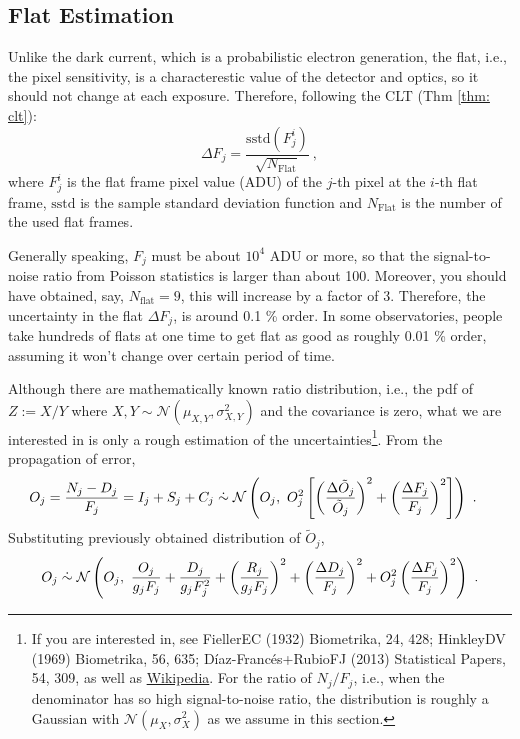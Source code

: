 \subsection{Flat Estimation}
Unlike the dark current, which is a probabilistic electron generation, the flat, i.e., the pixel sensitivity, is a characterestic value of the detector and optics, so it should not change at each exposure. Therefore, following the CLT (Thm \ref{thm: clt}): 
\begin{equation}
   \Delta F_j = \frac{\mathrm{sstd} (F_j^{i})}{\sqrt{N_\mathrm{Flat}}} ~,
\end{equation}
where $ F_j^{i} $ is the flat frame pixel value (ADU) of the $ j $-th pixel at the $ i $-th flat frame, $ \mathrm{sstd} $ is the sample standard deviation function and $ N_\mathrm{Flat} $ is the number of the used flat frames. 

Generally speaking, $ F_j $ must be about $ 10^4 $ ADU or more, so that the signal-to-noise ratio from Poisson statistics is larger than about 100. Moreover, you should have obtained, say, $ N_\mathrm{flat} = 9 $, this will increase by a factor of 3. Therefore, the uncertainty in the flat $ \Delta F_j $, is around 0.1 \% order. In some observatories, people take hundreds of flats at one time to get flat as good as roughly 0.01 \% order, assuming it won't change over certain period of time.

Although there are mathematically known ratio distribution, i.e., the pdf of $ Z := X/Y $ where $ X, Y \sim \mathcal{N}(\mu_{X, Y}, \sigma_{X, Y}^2) $ and the covariance is zero, what we are interested in is only a rough estimation of the uncertainties\footnote{If you are interested in, see FiellerEC (1932) Biometrika, 24, 428; HinkleyDV (1969) Biometrika, 56, 635;  D\'{i}az-Franc\'{e}s+RubioFJ (2013) Statistical Papers, 54, 309, as well as \href{https://en.wikipedia.org/wiki/Ratio_distribution}{Wikipedia}. For the ratio of $ N_j/F_j $, i.e., when the denominator has so high signal-to-noise ratio, the distribution is roughly a Gaussian with $ \mathcal{N}(\mu_X, \sigma_X^2) $ as we assume in this section.}. From the propagation of error, 
\begin{equation}
\begin{aligned}
  O_j = \frac{N_j - D_j}{F_j} = I_j + S_j + C_j
    &\mathrel{\dot{\sim}} \mathcal{N} 
      \left ( O_j,~ 
        O_j^2 \left [ 
        \left (\frac{\Delta \tilde{O}_j}{\tilde{O}_j} \right )^2 
        + \left (\frac{\Delta F_j}{F_j} \right )^2 \right ] \right ) ~.
\end{aligned}
\end{equation}
Substituting previously obtained distribution of $ \tilde{O}_j $,
\begin{equation}
  O_j 
    \mathrel{\dot{\sim}} \mathcal{N} 
      \left ( O_j,~ 
        \frac{O_j}{g_jF_j} 
        + \frac{D_j}{g_j F_j^2} 
        + \left (\frac{R_j}{g_j F_j} \right )^2 
        + \left  (\frac{\Delta D_j}{F_j} \right )^2
        + O_j^2 \left (\frac{\Delta F_j}{F_j} \right )^2
        \right ) ~.
\end{equation}

